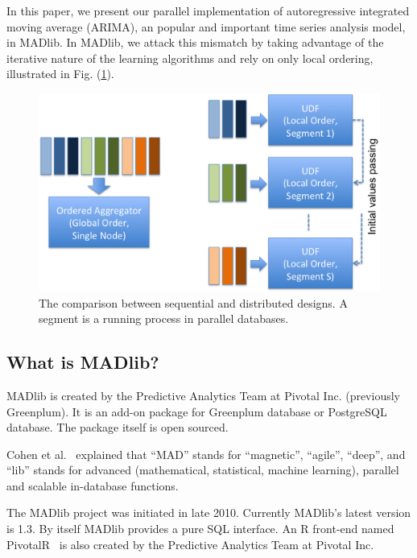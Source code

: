 \documentclass[english,10pt]{llncs}
\begin{document}
In this paper, we present our parallel implementation of autoregressive integrated moving average (ARIMA), an popular and important time series analysis model, in MADlib.
In MADlib, we attack this mismatch by taking advantage of the iterative nature of the learning algorithms and rely on only local ordering, illustrated in Fig. (\ref{fig:seq_vs_dist}).
\begin{figure}[ht]
  \begin{centering}
    \includegraphics[width=\textwidth]{sequential_vs_distributed.png}
  \end{centering}
  \caption{\label{fig:seq_vs_dist} The comparison between sequential
    and distributed designs. A segment is a running process in parallel databases.}
\end{figure}


\subsection{What is MADlib?}


MADlib is created by the Predictive Analytics Team at Pivotal Inc. (previously
Greenplum). It is an add-on package for Greenplum database or PostgreSQL
database. The package itself is open sourced.

Cohen et al.~\cite{mad-skills} explained that ``MAD'' stands for ``magnetic'',
``agile'', ``deep'', and ``lib'' stands for advanced (mathematical, statistical,
machine learning), parallel and scalable in-database functions.

The MADlib project was initiated in late 2010. Currently MADlib's latest
version is 1.3. By itself MADlib provides a pure SQL interface. An R
front-end named PivotalR~\cite{pivotalr} is also created by the
Predictive Analytics Team at Pivotal Inc.
\end{document}
